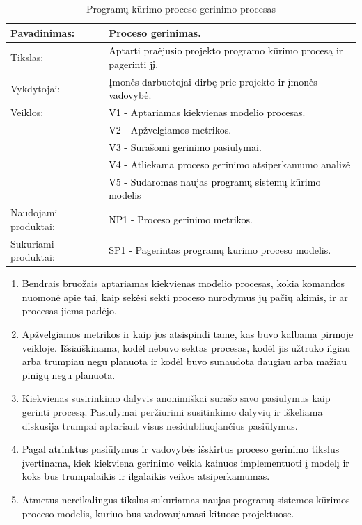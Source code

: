 \documentclass{VUMIFPSkursinis}
\begin{document}
	\begin{center}
		\begin{table}[ht]
			\caption{Programų kūrimo proceso gerinimo procesas}
			\begin{tabular}{ | l | l | }
				\hline
				Pavadinimas:         & Proceso gerinimas.						\\ \hline
				Tikslas:             & \textcolor{black}{Aptarti praėjusio projekto programo kūrimo procesą ir pagerinti jį.}			\\ \hline
				Vykdytojai:          & \textcolor{black}{ Įmonės darbuotojai dirbę prie projekto ir įmonės vadovybė.}					\\ \hline
				Veiklos:             & \textcolor{black}{V1 - Aptariamas kiekvienas modelio procesas.} 				\\
				                     & \textcolor{black}{V2 - Apžvelgiamos metrikos.}	\\
				                     & \textcolor{black}{V3 - Surašomi gerinimo pasiūlymai.}				\\ 
				                     & \textcolor{black}{V4 - Atliekama proceso gerinimo atsiperkamumo analizė} \\ 
				                     & \textcolor{black}{V5 - Sudaromas naujas programų sistemų kūrimo modelis} \\ \hline
				Naudojami produktai: & \textcolor{black}{NP1 - Proceso gerinimo metrikos. }				\\ \hline
				Sukuriami produktai: & \textcolor{black}{SP1 - Pagerintas programų kūrimo proceso modelis.}		\\ \hline
			\end{tabular}
		\end{table}
	\end{center}

	\begin{enumerate}
		\item{\textcolor{black}{Bendrais bruožais aptariamas kiekvienas modelio procesas, kokia komandos nuomonė apie tai, kaip sekėsi sekti proceso nurodymus jų pačių akimis, ir ar procesas jiems padėjo.}}
		\item{\textcolor{black}{Apžvelgiamos metrikos ir kaip jos atsispindi tame, kas buvo kalbama pirmoje veikloje. 
			Išsiaiškinama, kodėl nebuvo sektas procesas, kodėl jis užtruko ilgiau arba trumpiau negu planuota ir kodėl buvo sunaudota daugiau arba mažiau pinigų negu planuota.}}
		\item{Kiekvienas susirinkimo dalyvis anonimiškai surašo savo pasiūlymus kaip gerinti procesą.
			Pasiūlymai peržiūrimi susitinkimo dalyvių ir iškeliama diskusija trumpai aptariant visus nesidubliuojančius pasiūlymus.}
		\item{\textcolor{black}{Pagal atrinktus pasiūlymus ir vadovybės išskirtus proceso gerinimo tikslus įvertinama, kiek kiekviena gerinimo veikla kainuos implementuoti į modelį ir koks bus trumpalaikis ir ilgalaikis veikos atsiperkamumas.}}
		\item{\textcolor{black}{Atmetus nereikalingus tikslus sukuriamas naujas programų sistemos kūrimos proceso modelis, kuriuo bus vadovaujamasi kituose projektuose.}}
	\end{enumerate}
\end{document}
